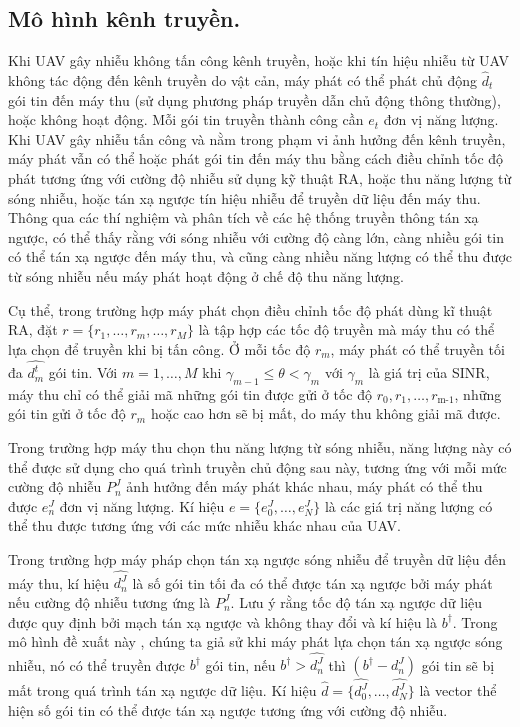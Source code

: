 \documentclass{uetgraduation}
\begin{document}
\subsection{Mô hình kênh truyền.}
Khi UAV gây nhiễu không tấn công kênh truyền, hoặc khi tín hiệu nhiễu từ UAV không tác động đến kênh truyền do vật cản, máy phát có thể phát chủ động $\hat{d}_t$
gói tin đến máy thu (sử dụng phương pháp truyền dẫn chủ động thông thường), hoặc không hoạt động. Mỗi gói tin truyền thành công cần $e_t$ đơn vị năng lượng.
Khi UAV gây nhiễu tấn công và nằm trong phạm vi ảnh hưởng đến kênh truyền, máy phát vẫn có thể hoặc phát gói tin đến máy thu bằng cách điều chỉnh tốc độ phát tương
ứng với cường độ nhiễu sử dụng kỹ thuật RA, hoặc thu năng lượng từ sóng nhiễu, hoặc tán xạ ngược tín hiệu nhiễu để truyền dữ liệu đến máy thu. Thông qua các thí nghiệm
và phân tích về các hệ thống truyền thông tán xạ ngược, có thể thấy rằng với sóng nhiễu với cường độ càng lớn, càng nhiều gói tin có thể tán xạ ngược đến máy thu, và cũng
càng nhiều năng lượng có thể thu được từ sóng nhiễu nếu máy phát hoạt động ở chế độ thu năng lượng. 

Cụ thể, trong trường hợp máy
phát chọn điều chỉnh tốc độ phát dùng kĩ thuật RA, đặt $r = \{r_1, \dots, r_m,\dots, r_M\}$ là tập hợp các tốc độ truyền mà máy thu có thể lựa chọn để truyền khi bị tấn
công. Ở mỗi tốc độ $r_m$, máy phát có thể truyền tối đa $\hat{d_m^t}$ gói tin. Với $m = 1, \dots, M$ khi $\gamma_{m-1} \leq \theta < \gamma_m$ với $\gamma_m$ là giá
trị của SINR, máy thu chỉ có thể giải mã những gói tin được gửi ở tốc độ $r_0, r_1, \dots, r_\text{m-1}$, những gói tin gửi ở tốc độ $r_m$ hoặc cao hơn sẽ bị mất,
do máy thu không giải mã được. 

Trong trường hợp máy thu chọn thu năng lượng từ sóng nhiễu, năng lượng này có thể được sử dụng cho quá trình truyền chủ động sau này, tương ứng với mỗi mức cường độ nhiễu $P_n^J$
ảnh hưởng đến máy phát khác nhau, máy phát có thể thu được $e_n^J$ đơn vị năng lượng. Kí hiệu $e = \{e_0^J, \dots, e_N^J\}$ là các giá trị năng lượng có thể thu được tương ứng
với các mức nhiễu khác nhau của UAV.

Trong trường hợp máy pháp chọn tán xạ ngược sóng nhiễu để truyền dữ liệu đến máy thu, kí hiệu $\hat{d_n^J}$ là số gói tin tối đa có thể được tán xạ ngược bởi máy phát nếu
cường độ nhiễu tương ứng là $P_n^J$. Lưu ý rằng tốc độ tán xạ ngược dữ liệu được quy định bởi mạch tán xạ ngược và không thay đổi và kí hiệu là $b^{\dagger}$. Trong mô hình đề xuất này
, chúng ta giả sử khi máy phát lựa chọn tán xạ ngược sóng nhiễu, nó có thể truyền được $b^{\dagger}$ gói tin, nếu $b^{\dagger} > \hat{d_n^J}$ thì $(b^{\dagger} - d_n^J)$ gói tin sẽ bị mất trong
quá trình tán xạ ngược dữ liệu. Kí hiệu $\hat{d} = \{\hat{d_0^J}, \dots, \hat{d_N^J}\}$ là vector thể hiện số gói tin có thể được tán xạ ngược tương ứng với cường độ nhiễu.
\end{document}
